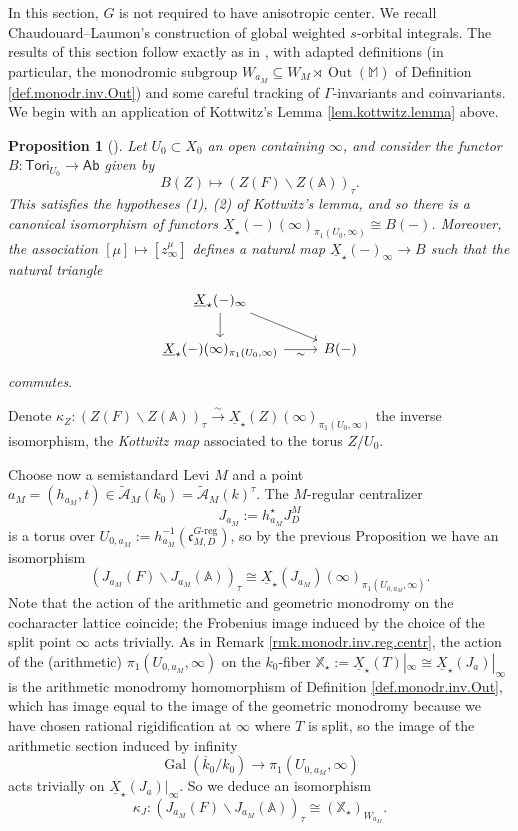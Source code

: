 \documentclass[openany]{amsbook}
\newtheorem{proposition}[theorem]{Proposition}
\theoremstyle{definition}
\theoremstyle{remark}
\numberwithin{equation}{section}
\newcommand{\cA}{\mathcal{A}}
\newcommand{\A}{\mathbb{A}}
\newcommand{\ol}[1]{\overline{#1}}
\newcommand{\ul}[1]{\underline{#1}}
\newcommand{\Gal}{\operatorname{Gal}}
\renewcommand{\-}{\operatorname{-}}
\newcommand{\Ab}{\mathsf{Ab}}
\newcommand{\Out}{\operatorname{Out}}
\newcommand{\M}{\mathbb{M}}
\renewcommand{\A}{\mathbb{A}}
\newcommand{\ctA}{\widetilde{\cA}}
\newcommand{\bX}{\mathbb{X}}
\newcommand{\fc}{\mathfrak{c}}
\newcommand{\Greg}{G\text{-reg}}
\begin{document}
In this section, $G$ is not required to have anisotropic center. We recall Chaudouard--Laumon's construction of global weighted $s$-orbital integrals. The results of this section follow exactly as in \cite[\S11]{CLII}, with adapted definitions (in particular, the monodromic subgroup $W_{a_M} \subseteq W_M \rtimes \Out(\M)$ of Definition \ref{def.monodr.inv.Out}) and some careful tracking of $\Gamma$-invariants and coinvariants. We begin with an application of Kottwitz's Lemma \ref{lem.kottwitz.lemma} above.

\begin{proposition}[{\cite[11.2.1]{CLII}}]\label{prop.kottwitz.Ja}
    Let $U_0 \subset X_0$ an open containing $\infty$, and consider the functor $B : \mathsf{Tori}_{U_0} \to \Ab$ given by
    $$
        B(Z) \mapsto (Z(F) \backslash Z(\A))_\tau.
    $$
    This satisfies the hypotheses (1), (2) of Kottwitz's lemma, and so there is a canonical isomorphism of functors $\ul{X}_\star(-)(\infty)_{\pi_1(U_0, \infty)} \cong B(-)$. Moreover, the association $[\mu] \mapsto [z_\infty^{\mu}]$ defines a natural map $\ul{X}_\star(-)_\infty \to B$ such that the natural triangle
    $$
        \begin{tikzcd}[ampersand replacement=\&]
            \ul{X}_\star(-)_\infty \ar[d] \ar[dr] \& \\
            \ul{X}_\star(-)(\infty)_{\pi_1(U_0, \infty)} \ar[r, "{\sim}" below] \& B(-)
        \end{tikzcd}
    $$
    commutes.
\end{proposition}

Denote $\kappa_Z : (Z(F) \backslash Z(\A))_\tau \xrightarrow{\sim}  \ul{X}_\star(Z)(\infty)_{\pi_1(U_0, \infty)}$ the inverse isomorphism, the \emph{Kottwitz map} associated to the torus $Z/U_0$.


Choose now a semistandard Levi $M$ and a point $a_M = (h_{a_M}, t) \in \ctA_M(k_0) = \ctA_M(k)^{\tau}$. The $M$-regular centralizer $$J_{a_M} := h^\star_{a_M} J^M_D$$ is a torus over $U_{0,a_M} := h^{-1}_{a_M}(\fc_{M,D}^{\Greg})$, so by the previous Proposition we have an isomorphism
$$
    (J_{a_M}(F)\backslash J_{a_M}(\A))_{\tau} \cong \ul{X}_\star(J_{a_M})(\infty)_{\pi_1(U_{0, a_M}, \infty)}.
$$
Note that the action of the arithmetic and geometric monodromy on the cocharacter lattice coincide; the Frobenius image induced by the choice of the split point $\infty$ acts trivially. As in Remark \ref{rmk.monodr.inv.reg.centr}, the action of the (arithmetic) $\pi_1(U_{0, a_M}, \infty)$ on the $k_0$-fiber $\bX_\star := \ul{X}_\star(T)|_\infty \cong \ul{X}_\star(J_a)|_\infty$ is the arithmetic monodromy homomorphism of Definition \ref{def.monodr.inv.Out}, which has image equal to the image of the geometric monodromy because we have chosen rational rigidification at $\infty$ where $T$ is split, so the image of the arithmetic section induced by infinity
$$
    \Gal(\ol{k}_0/k_0) \to \pi_1(U_{0, a_M}, \infty)
$$
acts trivially on $\ul{X}_\star(J_a)|_\infty$. So we deduce an isomorphism 
$$\kappa_J : (J_{a_M}(F) \backslash J_{a_M}(\A))_\tau \cong (\bX_\star)_{W_{a_M}}.$$
\end{document}
